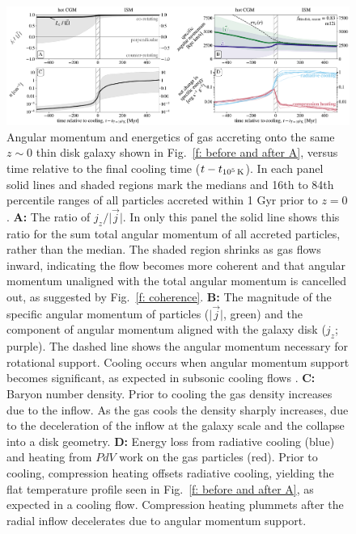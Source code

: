 \documentclass[fleqn,usenatbib]{mnras}
\newcommand{\tcools}{t_{10^5\,{\rm K}}}
\begin{document}
\begin{figure}
\includegraphics[width=\textwidth]{figures/before_and_after/before_and_after_m12i_md.pdf}
\caption{
Angular momentum and energetics of gas accreting onto the same $z\sim0$ thin disk galaxy shown in Fig.~\ref{f: before and after A}, versus time relative to the final cooling time ($t - \tcools$).
In each panel solid lines and shaded regions mark the medians and 16th to 84th percentile ranges of all particles accreted within 1 Gyr prior to $z=0$.
\textbf{A:}
The ratio of $j_z / \vert \vec j \vert$.
In only this panel the solid line shows this ratio for the sum total angular momentum of all accreted particles, rather than the median.
The shaded region shrinks as gas flows inward, indicating the flow becomes more coherent and that angular momentum unaligned with the total angular momentum is cancelled out, as suggested by Fig.~\ref{f: coherence}. 
\textbf{B:}
The magnitude of the specific angular momentum of particles ($\vert\vec{j}\vert$, green) and the component of angular momentum aligned with the galaxy disk ($j_z$; purple).
The dashed line shows the angular momentum necessary for rotational support.
Cooling occurs when angular momentum support becomes significant, as expected in subsonic cooling flows \citep{Cowie1980, Stern2019}.
\textbf{C:}
Baryon number density.
Prior to cooling the gas density increases due to the inflow.
As the gas cools the density sharply increases, due to the deceleration of the inflow at the galaxy scale and the collapse into a disk geometry. 
\textbf{D:}
Energy loss from radiative cooling (blue) and heating from $PdV$ work on the gas particles (red).
Prior to cooling, compression heating offsets radiative cooling, yielding the flat temperature profile seen in Fig.~\ref{f: before and after A}, as expected in a cooling flow.
Compression heating plummets after the radial inflow decelerates due to angular momentum support.
}
\label{f: before and after B}
\end{figure}
\end{document}
